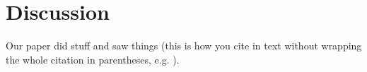 \section*{Discussion}

Our paper did stuff and saw things (this is how you cite in text without wrapping the whole citation in parentheses, e.g. ).